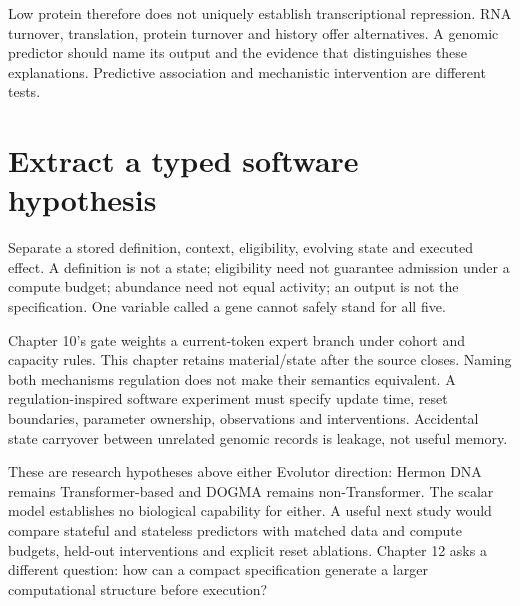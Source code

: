 Low protein therefore does not uniquely establish transcriptional repression.
RNA turnover, translation, protein turnover and history offer alternatives.
A genomic predictor should name its output and the evidence that distinguishes
these explanations. Predictive association and mechanistic intervention are
different tests.

\section{Extract a typed software hypothesis}
Separate a stored definition, context, eligibility, evolving state and executed
effect. A definition is not a state; eligibility need not guarantee admission
under a compute budget; abundance need not equal activity; an output is not
the specification. One variable called a gene cannot safely stand for all five.

Chapter 10's gate weights a current-token expert branch under cohort and
capacity rules. This chapter retains material/state after the source closes.
Naming both mechanisms regulation does not make their semantics equivalent.
A regulation-inspired software experiment must specify update time, reset
boundaries, parameter ownership, observations and interventions. Accidental
state carryover between unrelated genomic records is leakage, not useful memory.

These are research hypotheses above either Evolutor direction: Hermon DNA
remains Transformer-based and DOGMA remains non-Transformer.
The scalar model establishes no biological capability for either.
A useful next study would compare stateful and stateless predictors with
matched data and compute budgets, held-out interventions and explicit
reset ablations. Chapter 12 asks a different question: how can a compact
specification generate a larger computational structure before execution?

\clearpage
